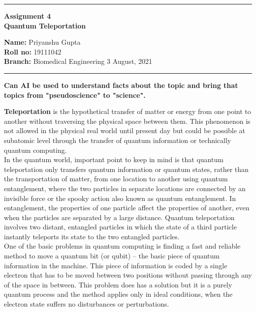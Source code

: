 \documentclass[10pt,a4paper,twoside]{article}
\begin{document}
\begin{center}
\hrule

\vspace{.3cm}
{\bf {\Large Assignment 4 }}\\
{\bf {\huge Quantum Teleportation}}
\vspace{.2cm}
\end{center}
{\bf Name:}  Priyanshu Gupta\\
{\bf Roll no:}  19111042 \\
{\bf Branch: }  Biomedical Engineering \hspace{\fill}  3 August, 2021 \\
\hrule

\vspace{.4cm}
\begin{center}{\textbf{\large Can AI be used to understand facts about the topic and bring that topics from "pseudoscience" to "science".}} \end{center}

\textbf{Teleportation} is the hypothetical transfer of matter or energy from one point to another without traversing the physical space between them. This phenomenon is not allowed in the physical real world until present day but could be possible at subatomic level through the transfer of quantum information or technically quantum computing. \\

In the quantum world, important point to keep in mind is that quantum teleportation only transfers quantum information or quantum states, rather than the transportation of matter, from one location to another using quantum entanglement, where the two particles in separate locations are connected by an invisible force or the spooky action also known as quantum entanglement. In entanglement, the properties of one particle affect the properties of another, even when the particles are separated by a large distance. Quantum teleportation involves two distant, entangled particles in which the state of a third particle instantly teleports its state to the two entangled particles.\\

One of the basic problems in quantum computing is finding a fast and reliable method to move a quantum bit (or qubit) – the basic piece of quantum information in the machine. This piece of information is coded by a single electron that has to be moved between two positions without passing through any of the space in between. This problem does has a solution but it is a purely quantum process and the method applies only in ideal conditions, when the electron state suffers no disturbances or perturbations.\\
\end{document}
